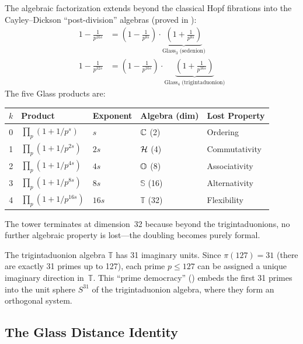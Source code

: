 The algebraic factorization extends beyond the classical Hopf
fibrations into the Cayley--Dickson ``post-division'' algebras
(proved in ):
\begin{align}
  1 - \frac{1}{p^{16s}} &= \left(1 - \frac{1}{p^{8s}}\right)
  \cdot \underbrace{\left(1 + \frac{1}{p^{8s}}\right)}_{\text{Glass}_3\;\text{(sedenion)}} \\
  1 - \frac{1}{p^{32s}} &= \left(1 - \frac{1}{p^{16s}}\right)
  \cdot \underbrace{\left(1 + \frac{1}{p^{16s}}\right)}_{\text{Glass}_4\;\text{(trigintaduonion)}}
\end{align}
The five Glass products are:
\begin{center}
\begin{tabular}{@{}cllll@{}}
\toprule
$k$ & \textbf{Product} & \textbf{Exponent} & \textbf{Algebra (dim)} & \textbf{Lost Property} \\
\midrule
0 & $\prod_p(1 + 1/p^s)$ & $s$ & $\mathbb{C}$ (2) & Ordering \\
1 & $\prod_p(1 + 1/p^{2s})$ & $2s$ & $\mathcal{H}$ (4) & Commutativity \\
2 & $\prod_p(1 + 1/p^{4s})$ & $4s$ & $\mathbb{O}$ (8) & Associativity \\
3 & $\prod_p(1 + 1/p^{8s})$ & $8s$ & $\mathbb{S}$ (16) & Alternativity \\
4 & $\prod_p(1 + 1/p^{16s})$ & $16s$ & $\mathbb{T}$ (32) & Flexibility \\
\bottomrule
\end{tabular}
\end{center}
The tower terminates at dimension~32 because beyond the trigintaduonions,
no further algebraic property is lost---the doubling becomes purely formal.

\begin{principle}
The trigintaduonion algebra $\mathbb{T}$ has 31 imaginary units. Since
$\pi(127) = 31$ (there are exactly 31 primes up to 127), each prime
$p \leq 127$ can be assigned a unique imaginary direction in~$\mathbb{T}$.
This ``prime democracy'' () embeds the
first 31 primes into the unit sphere $S^{31}$ of the trigintaduonion
algebra, where they form an orthogonal system.
\end{principle}

\subsection{The Glass Distance Identity}

